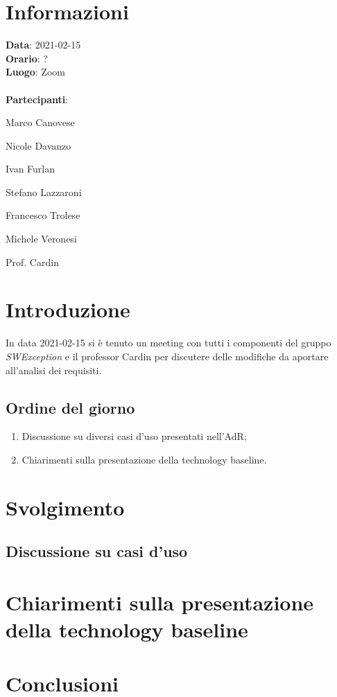 \section{Informazioni}
\textbf{Data}: 2021-02-15\\
\textbf{Orario}: ?\\
\textbf{Luogo}: Zoom\\\\
\textbf{Partecipanti}:\begin{list}{*}{\setlength{\itemsep}{0cm}}
	\item Marco Canovese
	\item Nicole Davanzo
	\item Ivan Furlan
	\item Stefano Lazzaroni
	\item Francesco Trolese
	\item Michele Veronesi
	\item Prof. Cardin
\end{list}

\section{Introduzione}
In data 2021-02-15 si è tenuto un meeting con tutti i componenti del gruppo \textit{SWException} e il professor Cardin per discutere delle modifiche da aportare all'analisi dei requisiti. \\

\subsection{Ordine del giorno}
\begin{enumerate}
    \item Discussione su diversi casi d'uso presentati nell'AdR;
    \item Chiarimenti sulla presentazione della technology baseline.
\end{enumerate}

\section{Svolgimento}

\subsection{Discussione su casi d'uso}

\section{Chiarimenti sulla presentazione della technology baseline}


\section{Conclusioni}

